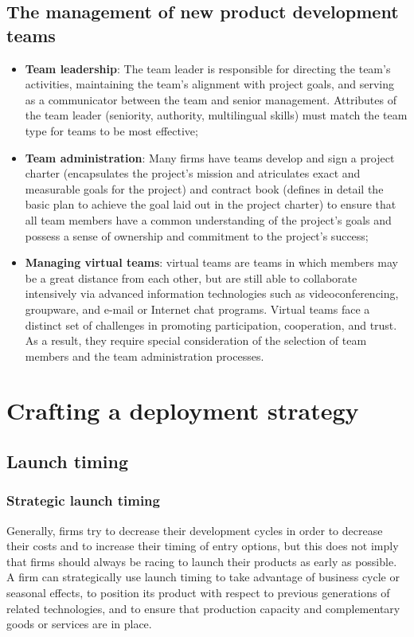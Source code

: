 \documentclass[12pt]{article}
\begin{document}
\subsection{The management of new product development teams}
\begin{itemize}
    \item \textbf{Team leadership}: The team leader is responsible for directing the team's activities, maintaining the team's
    alignment with project goals, and serving as a communicator between the team and senior management.
    Attributes of the team leader (seniority, authority, multilingual skills) must match the team type for teams to be most effective;
    \item \textbf{Team administration}: Many firms have teams develop and sign a project charter (encapsulates the project's mission and atriculates exact and measurable goals for the project) and contract book (defines in detail the basic plan
    to achieve the goal laid out in the project charter) to ensure that all team members have a common understanding of the project's goals and possess a sense of ownership and commitment to the project's success;
    \item \textbf{Managing virtual teams}: virtual teams are teams in which members may be a great distance from each other, but are still able to collaborate intensively via advanced information technologies such as videoconferencing, groupware, and e-mail or Internet chat programs. Virtual teams face a distinct set of challenges in promoting participation, cooperation, and trust. As a result, they require special consideration of the selection of
    team members and the team administration processes.
\end{itemize}

\section{Crafting a deployment strategy}
\subsection{Launch timing}

\subsubsection{Strategic launch timing}
Generally, firms try to decrease their development cycles in order to decrease their
costs and to increase their timing of entry options, but this does not imply that firms
should always be racing to launch their products as early as possible. A firm can strategically use launch timing to take advantage of business cycle or seasonal effects, to
position its product with respect to previous generations of related technologies, and to ensure that production capacity and complementary goods or services are in place.
\end{document}
